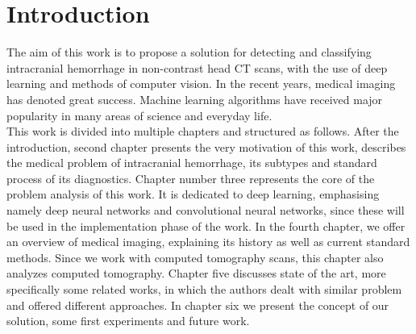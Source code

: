 \chapter{Introduction}

The aim of this work is to propose a solution for detecting and classifying intracranial hemorrhage in non-contrast head CT scans, with the use of deep learning and methods of computer vision. 
In the recent years, medical imaging has denoted great success. Machine learning algorithms have received major popularity in many areas of science and everyday life. 
\vspace{0.8cm}
\\This work is divided into multiple chapters and structured as follows. After the introduction, second chapter presents the very motivation of this work, describes the medical problem of intracranial hemorrhage, its subtypes and standard process of its diagnostics. Chapter number three represents the core of the problem analysis of this work. It is dedicated to deep learning, emphasising namely deep neural networks and convolutional neural networks, since these will be used in the implementation phase of the work. In the fourth chapter, we offer an overview of medical imaging, explaining its history as well as current standard methods. Since we work with computed tomography scans, this chapter also analyzes computed tomography. Chapter five discusses state of the art, more specifically some related works, in which the authors dealt with similar problem and offered different approaches. In chapter six we present the concept of our solution, some first experiments and future work.
